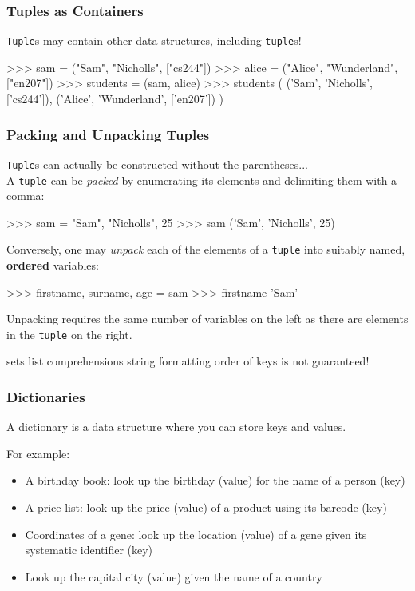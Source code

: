 \documentclass{beamer}
\begin{document}
\begin{frame}[fragile]
\frametitle{Tuples as Containers}
    \texttt{Tuple}s may contain other data structures, including \texttt{tuple}s!

\begin{code}
>>> sam = ("Sam", "Nicholls", ["cs244"])
>>> alice = ("Alice", "Wunderland", ["en207"])
>>> students = (sam, alice)
>>> students
(
    ('Sam', 'Nicholls', ['cs244']),
    ('Alice', 'Wunderland', ['en207'])
)
\end{code}
\end{frame}


\begin{frame}[fragile]
\frametitle{Packing and Unpacking Tuples}
    \texttt{Tuple}s can actually be constructed without the parentheses...\\
    A \texttt{tuple} can be \textit{packed} by enumerating its elements
and delimiting them with a comma:

\begin{code}
>>> sam = "Sam", "Nicholls", 25
>>> sam
('Sam', 'Nicholls', 25)
\end{code}

\vskip 0.3cm
Conversely, one may \textit{unpack} each of the elements of a \texttt{tuple}
    into suitably named, \textbf{ordered} variables:
\begin{code}
>>> firstname, surname, age = sam
>>> firstname
'Sam'
\end{code}
Unpacking requires the same number of variables on the left as there
    are elements in the \texttt{tuple} on the right.
\end{frame}

sets
list comprehensions
string formatting
order of keys is not guaranteed!

\begin{frame}[fragile]
\frametitle{Dictionaries}
A dictionary is a data structure where you can store
keys and values.

For example:
\begin{itemize}
\item A birthday book: look up the birthday (value) for the
name of a person (key)
\item A price list: look up the price (value) of a product
using its barcode (key)
\item Coordinates of a gene: look up the location (value)
of a gene given its systematic identifier (key)
\item Look up the capital city (value) given the name of a
country
\end{itemize}
\end{frame}
\end{document}
